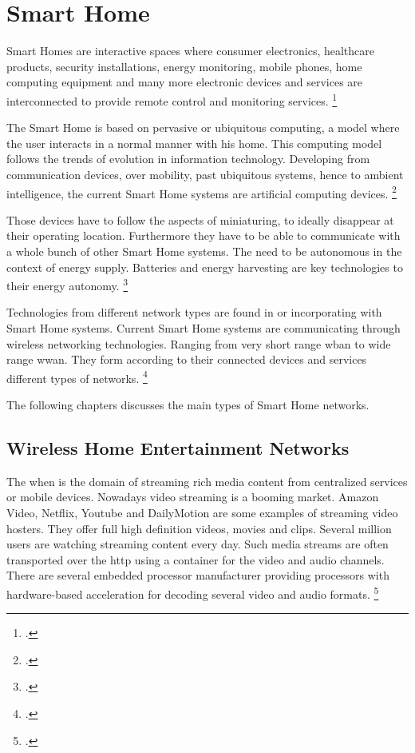 \chapter{Smart Home}
\label{ch:smart-home}

Smart Homes are interactive spaces where consumer electronics, healthcare products, security installations, energy monitoring, mobile phones, home computing equipment and many more electronic devices and services are interconnected to provide remote control and monitoring services. \footcite[Cf.][]{Alam2012}

The Smart Home is based on pervasive or ubiquitous computing, a model where the user interacts in a normal manner with his home. This computing model follows the trends of evolution in information technology. Developing from communication devices, over mobility, past ubiquitous systems, hence to ambient intelligence, the current Smart Home systems are artificial computing devices. \footcite[Cf.][]{Lalanda2010}

Those devices have to follow the aspects of miniaturing, to ideally disappear at their operating location. Furthermore they have to be able to communicate with a whole bunch of other Smart Home systems. The need to be autonomous in the context of energy supply. Batteries and energy harvesting are key technologies to their energy autonomy. \footcite[Cf.][]{Lalanda2010}

Technologies from different network types are found in or incorporating with Smart Home systems. Current Smart Home systems are communicating through wireless networking technologies. Ranging from very short range \gls{wban} to wide range \gls{wwan}. They form according to their connected devices and services different types of networks. \footcite[Cf.][]{Saito2013}

The following chapters discusses the main types of Smart Home networks.

\section{Wireless Home Entertainment Networks}

The \gls{when} is the domain of streaming rich media content from centralized services or mobile devices. Nowadays video streaming is a booming market. Amazon Video, Netflix, Youtube and DailyMotion are some examples of streaming video hosters. They offer full high definition videos, movies and clips. Several million users are watching streaming content every day. Such media streams are often transported over the \gls{http} using a container for the video and audio channels. There are several embedded processor manufacturer providing processors with hardware-based acceleration for decoding several video and audio formats. \footcite[Cf.][593--596]{Kurose2012}

